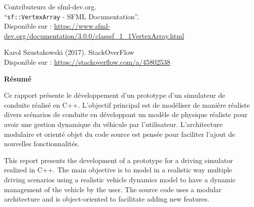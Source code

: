 \documentclass[a4paper,12pt]{report}
\begin{document}
\begin{thebibliography}{9}
        Contributeurs de sfml-dev.org.\\
        ``\texttt{sf::VertexArray} - SFML Documentation''.\\
        Disponible sur : \url{https://www.sfml-dev.org/documentation/3.0.0/classsf_1_1VertexArray.html}

        Karol Szustakowski (2017).
        StackOverFlow \\
        Disponible sur : \url{https://stackoverflow.com/a/45802538}
    \end{thebibliography}

    \clearpage
    \vspace*{\fill}
    \begin{center}
    {\Large \textbf{Résumé}}
    \end{center}
    \bigskip
    \noindent
    \begin{minipage}{\textwidth}
        Ce rapport présente le développement d'un prototype d'un simulateur de conduite réalisé en C++.
        L'objectif principal est de modéliser de manière réaliste divers scénarios de conduite en développant un modèle de physique réaliste pour avoir une gestion dynamique du véhicule par l'utilisateur.
        L'architecture modulaire et orienté objet du code source est pensée pour faciliter l'ajout de nouvelles fonctionnalités.

        \bigskip

        This report presents the development of a prototype for a driving simulator realized in C++.
        The main objective is to model in a realistic way multiple driving scenarios using a realistic vehicle dynamics model to have a dynamic management of the vehicle by the user.
        The source code uses a modular architecture and is object-oriented to facilitate adding new features.
    \end{minipage}
    \vspace*{\fill} %
    \clearpage
\end{document}
